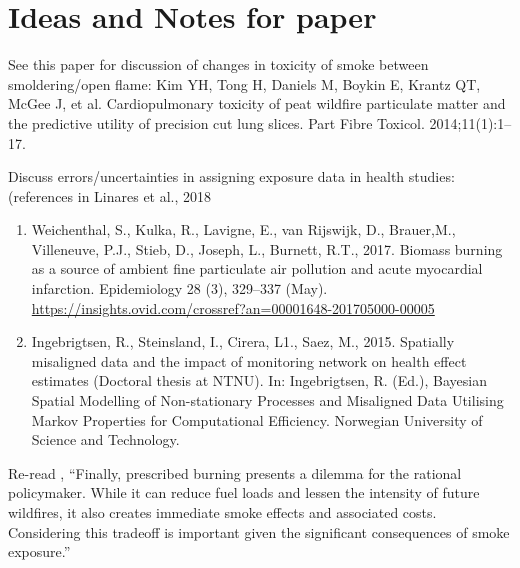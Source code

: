 \section{Ideas and Notes for paper}

See this paper for discussion of changes in toxicity of smoke between smoldering/open flame: Kim YH, Tong H, Daniels M, Boykin E, Krantz QT, McGee J, et al.
Cardiopulmonary toxicity of peat wildfire particulate matter and the predictive
utility of precision cut lung slices. Part Fibre Toxicol. 2014;11(1):1–17.

Discuss errors/uncertainties in assigning exposure data in health studies: (references in Linares et al., 2018 \cite{linares_impact_2018}
\begin{enumerate}
\item Weichenthal, S., Kulka, R., Lavigne, E., van Rijswijk, D., Brauer,M., Villeneuve, P.J., Stieb, D.,
Joseph, L., Burnett, R.T., 2017. Biomass burning as a source of ambient fine particulate
air pollution and acute myocardial infarction. Epidemiology 28 (3), 329–337 (May). \url{https://insights.ovid.com/crossref?an=00001648-201705000-00005}

\item Ingebrigtsen, R., Steinsland, I., Cirera, L1., Saez, M., 2015. Spatially misaligned data and the
impact of monitoring network on health effect estimates (Doctoral thesis at NTNU).
In: Ingebrigtsen, R. (Ed.), Bayesian Spatial Modelling of Non-stationary Processes
and Misaligned Data Utilising Markov Properties for Computational Efficiency. Norwegian
University of Science and Technology. 
\end{enumerate}

Re-read \cite{jones_application_2017}, ``Finally, prescribed burning presents a dilemma for the rational policymaker. While it can reduce fuel loads and lessen the intensity of future wildfires, it also creates immediate smoke effects and associated costs. Considering this tradeoff is important given the significant consequences of smoke exposure.''